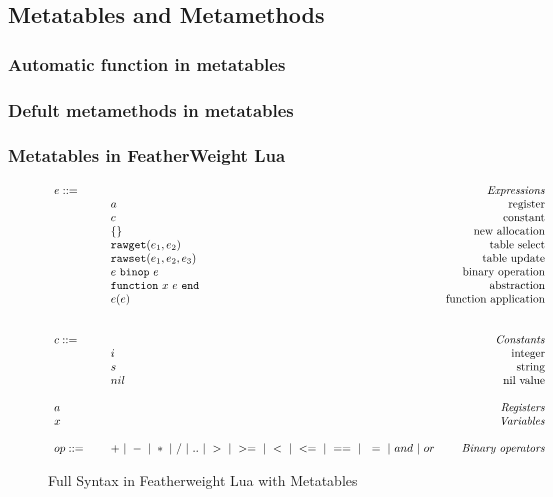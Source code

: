 \documentclass{article}
\begin{document}
\subsection{Metatables and Metamethods}
\subsubsection{Automatic function in metatables}
\subsubsection{Defult metamethods in metatables}
\subsubsection{Metatables in FeatherWeight Lua}

\begin{figure}
\caption{Full Syntax in Featherweight Lua with Metatables}
\label{fig:FW2Syx}
\[
  \begin{array}{llr}
  \mydefhead{e ::=\qquad\qquad\qquad\qquad}{Expressions}
  \mydefcase{a}{register}
  \mydefcase{c}{constant}
  \mydefcase{\{\}}{new allocation}
  \mydefcase{{\tt rawget}(e_1,e_2)}{table select}
  \mydefcase{{\tt rawset}(e_1,e_2,e_3)}{table update}
  \mydefcase{e ~{\tt binop}~ e}{binary operation}
  \mydefcase{\abFunction x e}{abstraction}
  \mydefcase{e(e)}{function application}
  \\
  \\
  \mydefhead{c ::=\qquad\qquad\qquad\qquad}{Constants}
  \mydefcase{i}{integer}
  \mydefcase{s}{string}
  \mydefcase{nil}{nil value}
  \\
  \mydefhead{a \qquad\qquad\qquad\qquad}{Registers}
  \mydefhead{x \qquad\qquad\qquad\qquad}{Variables}
  \\
  op ::= & + ~|~ - ~|~ * ~|~ / ~|~ .. ~|~ > ~|~ >= ~|~ < ~|~ <= ~|~ == ~|~ ~= ~|~ and ~|~ or & \mbox{\emph{Binary operators}} \\
\end{array}
\]
\end{figure}

\end{document}
